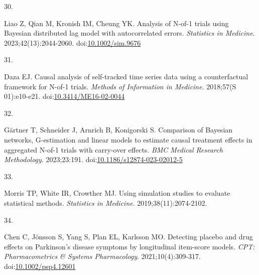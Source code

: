 \documentclass[
  11pt,
]{article}
\newlength{\cslhangindent}
\newlength{\csllabelwidth}
\newenvironment{CSLReferences}[2] %
 {\begin{list}{}{%
  \setlength{\itemindent}{0pt}
  \setlength{\leftmargin}{0pt}
  \setlength{\parsep}{0pt}
  \ifodd #1
   \setlength{\leftmargin}{\cslhangindent}
   \setlength{\itemindent}{-1\cslhangindent}
  \fi
  \setlength{\itemsep}{#2\baselineskip}}}
 {\end{list}}
\newcommand{\CSLLeftMargin}[1]{\parbox[t]{\csllabelwidth}{\strut#1\strut}}
\newcommand{\CSLRightInline}[1]{\parbox[t]{\linewidth - \csllabelwidth}{\strut#1\strut}}
\begin{document}
\begin{CSLReferences}{0}{1}
\CSLLeftMargin{30. }%
\CSLRightInline{Liao Z, Qian M, Kronish IM, Cheung YK. Analysis of {N}-of-1 trials using {B}ayesian distributed lag model with autocorrelated errors. \emph{Statistics in Medicine}. 2023;42(13):2044-2060. doi:\href{https://doi.org/10.1002/sim.9676}{10.1002/sim.9676}}

\CSLLeftMargin{31. }%
\CSLRightInline{Daza EJ. Causal analysis of self-tracked time series data using a counterfactual framework for {N-of-1} trials. \emph{Methods of Information in Medicine}. 2018;57(S 01):e10-e21. doi:\href{https://doi.org/10.3414/ME16-02-0044}{10.3414/ME16-02-0044}}

\CSLLeftMargin{32. }%
\CSLRightInline{Gärtner T, Schneider J, Arnrich B, Konigorski S. Comparison of {Bayesian} networks, {G}-estimation and linear models to estimate causal treatment effects in aggregated {N-of-1} trials with carry-over effects. \emph{BMC Medical Research Methodology}. 2023;23:191. doi:\href{https://doi.org/10.1186/s12874-023-02012-5}{10.1186/s12874-023-02012-5}}

\CSLLeftMargin{33. }%
\CSLRightInline{Morris TP, White IR, Crowther MJ. Using simulation studies to evaluate statistical methods. \emph{Statistics in Medicine}. 2019;38(11):2074-2102.}

\CSLLeftMargin{34. }%
\CSLRightInline{Chen C, Jönsson S, Yang S, Plan EL, Karlsson MO. Detecting placebo and drug effects on {Parkinson's} disease symptoms by longitudinal item-score models. \emph{CPT: Pharmacometrics \& Systems Pharmacology}. 2021;10(4):309-317. doi:\href{https://doi.org/10.1002/psp4.12601}{10.1002/psp4.12601}}

\end{CSLReferences}
\end{document}
